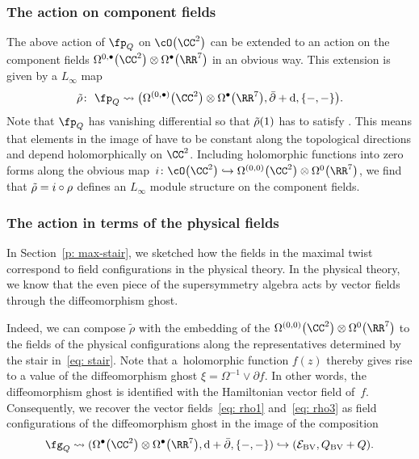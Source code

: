 \documentclass[pdftex]{sigma}
\numberwithin{equation}{section}
\theoremstyle{definition}
\def\cE{\mathcal E}\def\cF{\mathcal F}\def\cG{\mathcal G}\def\cH{\mathcal H}
\def\d{{\rm d}}
\def\bu{\bullet}
\begin{document}
\subsubsection{The action on component fields}
The above action of $\fp_Q$ on $\cO\big(\CC^2\big)$ can be extended to an action on the component fields $\Omega^{0,\bu}\big(\CC^2\big) \otimes \Omega^\bu\big(\RR^7\big)$ in an obvious way. This extension is given by a $L_\infty$ map
\[
 \Tilde{\rho}\colon\ \fp_Q \rightsquigarrow \big(\Omega^{(0,\bu)}\big(\CC^2\big) \otimes \Omega^\bullet\big(\RR^7\big) , \bar{\partial} + \d , \{-,-\} \big).
\]
Note that $\fp_Q$ has vanishing differential so that $\Tilde{\rho}{(1)}$ has to satisfy
\smash{$
 \big(\d + \bar{\partial}\big) \circ \Tilde{\rho}^{(1)} = 0$}.
This means that elements in the image of  have to be constant along the topological directions and depend holomorphically on $\CC^2$. Including holomorphic functions into zero forms along the obvious map~${i \colon \cO\big(\CC^2\big) \hookrightarrow \Omega^{(0,0)}\big(\CC^2\big) \otimes \Omega^0\big(\RR^7\big)}$, we find that $\Tilde{\rho} = i \circ \rho$ defines an $L_\infty$ module structure on the component fields.

\subsubsection{The action in terms of the physical fields}
In Section~\ref{p: max-stair}, we sketched how the fields in the maximal twist correspond to field configurations in the physical theory. In the physical theory, we know that the even piece of the supersymmetry algebra acts by vector fields through the diffeomorphism ghost.

Indeed, we can compose $\tilde{\rho}$ with the embedding of the $\Omega^{(0,0)}\big(\CC^2\big) \otimes \Omega^0\big(\RR^7\big)$ to the fields of the physical configurations along the representatives determined by the stair in~\eqref{eq: stair}. Note that a~holomorphic function $f(z)$ thereby gives rise to a value of the diffeomorphism ghost $
 \xi = \Omega^{-1} \vee \partial f $.
In other words, the diffeomorphism ghost is identified with the Hamiltonian vector field of~$f$. Consequently, we recover the vector fields~\eqref{eq: rho1} and~\eqref{eq: rho3} as field configurations of the diffeomorphism ghost in the image of the composition
\[
 \fg_Q \rightsquigarrow (\Omega^\bu\big(\CC^2\big) \otimes \Omega^\bu\big(\RR^7\big) , \d + \bar{\partial} , \{-,-\} ) \hookrightarrow (\cE_{\rm BV} , Q_{\rm BV} + Q) .
\]
\end{document}

